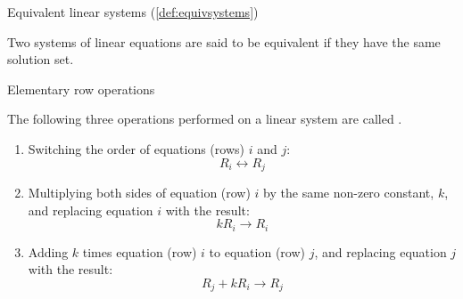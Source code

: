 \documentclass{ximera}
\begin{document}
\begin{center}
\end{center}

Equivalent linear systems (\ref{def:equivsystems})
\begin{expandable}
    Two systems of linear equations are said to be equivalent if they have the same solution set.
\end{expandable}

\begin{center}
\end{center}

Elementary row operations
\begin{expandable}
    The following three operations performed on a linear system are called .
\begin{enumerate}
\item Switching the order of equations (rows) $i$ and $j$:
$$R_i\leftrightarrow R_j$$
\item Multiplying both sides of equation (row) $i$ by the same non-zero constant, $k$, and replacing equation $i$ with the result:
$$kR_i\rightarrow R_i$$
\item Adding $k$ times equation (row) $i$ to equation (row) $j$, and replacing equation $j$ with the result:
$$R_j+kR_i\rightarrow R_j$$
\end{enumerate}
\end{expandable}

\begin{center}
\end{center}
\end{document}
